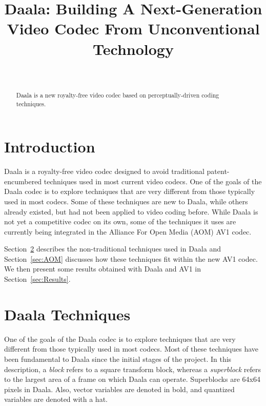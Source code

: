 \documentclass[english,conference,10pt]{IEEEtran}
\begin{document}
\title{Daala: Building A Next-Generation Video Codec From Unconventional
Technology}


\author{\author{
\\
}}
\maketitle
\begin{abstract}
Daala is a new royalty-free video codec based on perceptually-driven
coding techniques.
\end{abstract}


\section{Introduction}

Daala is a royalty-free video codec designed to avoid traditional
patent-encumbered techniques used in most current video codecs. One
of the goals of the Daala codec is to explore techniques that are
very different from those typically used in most codecs. Some of
these techniques are new to Daala, while others already existed, but
had not been applied to video coding before. While Daala is not yet
a competitive codec on its own, some of the techniques it uses are
currently being integrated in the Alliance For Open Media (AOM) AV1 codec.

Section~\ref{sec:techniques} describes the non-traditional techniques used
in Daala and Section~\ref{sec:AOM} discusses how these techniques fit within
the new AV1 codec. We then present some results obtained with Daala and AV1
in Section~\ref{sec:Results}.

\section{Daala Techniques}
\label{sec:techniques}

One of the goals of the Daala codec is to explore techniques that
are very different from those typically used in most codecs. Most
of these techniques have been fundamental to Daala since the initial
stages of the project. In this description, a \textit{block} refers to
a square transform block, whereas a \textit{superblock} refers to the
largest area of a frame on which Daala can operate. Superblocks are 64x64
pixels in Daala. Also, vector variables are denoted in bold, and quantized
variables are denoted with a hat.
\end{document}
